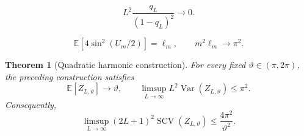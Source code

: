 \documentclass[10pt,a4paper]{amsart}
\newtheorem{theorem}{Theorem}
\newcommand{\E}{\mathbb E}
\newcommand{\SCV}{\operatorname{SCV}}
\newcommand{\Var}{\operatorname{Var}}
\begin{document}
\begin{equation}\label{eq:replica-negligible}
  L^2\frac{q_L}{(1-q_L)^2}\longrightarrow0.
\end{equation}

\begin{equation}\label{eq:circular-moment}
  \E\!\left[4\sin^2(U_m/2)\right]=\ell_m,
  \qquad m^2\ell_m\longrightarrow\pi^2.
\end{equation}

\begin{theorem}[Quadratic harmonic construction]\label{thm:quadratic-construction}
For every fixed $\vartheta\in(\pi,2\pi)$, the preceding construction satisfies
\begin{equation}\label{eq:construction-moments}
  \E[Z_{L,\vartheta}]\longrightarrow\vartheta,
  \qquad
  \limsup_{L\to\infty}L^2\Var(Z_{L,\vartheta})\leq\pi^2.
\end{equation}
Consequently,
\begin{equation}\label{eq:construction-bound}
  \limsup_{L\to\infty}(2L+1)^2\SCV(Z_{L,\vartheta})
  \leq\frac{4\pi^2}{\vartheta^2}.
\end{equation}
\end{theorem}
\end{document}
